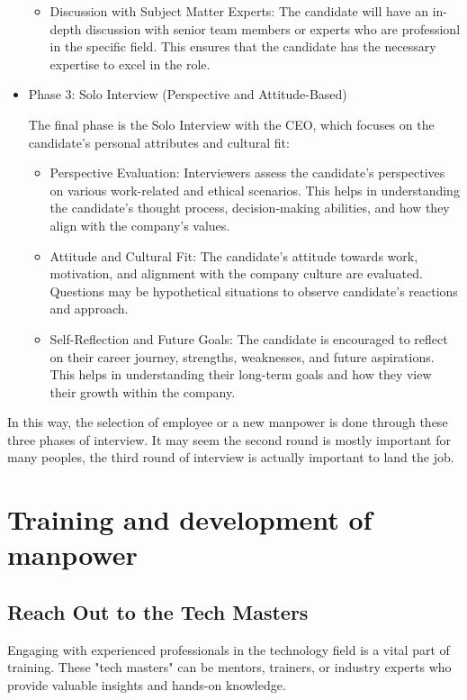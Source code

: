\begin{itemize}
\begin{itemize}
    \item Discussion with Subject Matter Experts:
        The candidate will have an in-depth discussion with senior team members or experts who are professionl in the specific field. This ensures that the candidate has the necessary expertise to excel in the role.
    \end{itemize} 
\item Phase 3: Solo Interview (Perspective and Attitude-Based)

The final phase is the Solo Interview with the CEO, which focuses on the candidate's personal attributes and cultural fit:
    \begin{itemize}
    \item Perspective Evaluation:
        Interviewers assess the candidate’s perspectives on various work-related and ethical scenarios. This helps in understanding the candidate's thought process, decision-making abilities, and how they align with the company's values.

    \item Attitude and Cultural Fit:
        The candidate's attitude towards work, motivation, and alignment with the company culture are evaluated. Questions may be hypothetical situations to observe candidate's reactions and approach.

    \item Self-Reflection and Future Goals:
        The candidate is encouraged to reflect on their career journey, strengths, weaknesses, and future aspirations. This helps in understanding their long-term goals and how they view their growth within the company.
    \end{itemize}     
\end{itemize}

In this way, the selection of employee or a new manpower is done through these three phases of interview. It may seem the second round is mostly important for many peoples, the third round of interview is actually important to land the job.
\section{Training and development of manpower}
\subsection{Reach Out to the Tech Masters}


Engaging with experienced professionals in the technology field is a vital part of training. These "tech masters" can be mentors, trainers, or industry experts who provide valuable insights and hands-on knowledge.

